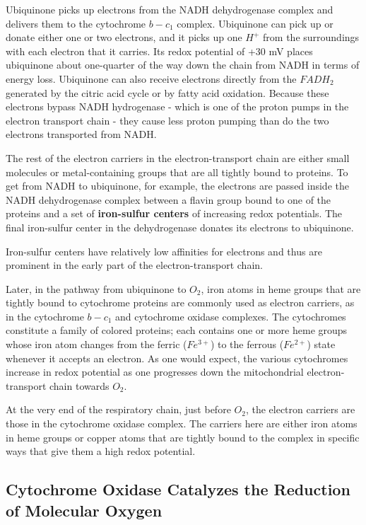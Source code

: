 Ubiquinone picks up electrons from the NADH dehydrogenase complex
and delivers them to the cytochrome $b-c_1$ complex.
Ubiquinone can pick up or donate either one or two electrons, and it
picks up one $H^+$ from the surroundings with each electron that it carries.
Its redox potential of +30 mV places ubiquinone about
one-quarter of the way down the chain from NADH in terms of energy
loss. Ubiquinone can also receive electrons directly from
the $FADH_2$ generated by the citric acid cycle or by fatty acid oxidation.
Because these electrons bypass NADH hydrogenase - which is one of the
proton pumps in the electron transport chain - they cause less proton
pumping than do the two electrons transported from NADH.

The rest of the electron carriers in the electron-transport chain are either
small molecules or metal-containing groups that are all tightly bound to
proteins. To get from NADH to ubiquinone, for example, the electrons are
passed inside the NADH dehydrogenase complex between a flavin group
bound to one of the proteins and a set of \textbf{iron-sulfur centers} of
increasing redox potentials. The final iron-sulfur center in the dehydrogenase
donates its electrons to ubiquinone.

Iron-sulfur centers have relatively low affinities for electrons and thus
are prominent in the early part of the electron-transport chain.

Later, in the pathway from ubiquinone to $O_2$, iron atoms in heme groups that are
tightly bound to cytochrome proteins are commonly used as electron
carriers, as in the cytochrome $b-c_1$ and cytochrome oxidase complexes.
The cytochromes constitute a family of colored proteins; each contains one or more heme
groups whose iron atom changes from the ferric ($Fe^{3+}$) to the ferrous
($Fe^{2+}$) state whenever it accepts an electron. As one would expect, the
various cytochromes increase in redox potential as one progresses down
the mitochondrial electron-transport chain towards $O_2$.

At the very end of the respiratory chain, just before $O_2$, the electron carriers
are those in the cytochrome oxidase complex. The carriers here are
either iron atoms in heme groups or copper atoms that are tightly bound
to the complex in specific ways that give them a high redox potential.

\subsection{Cytochrome Oxidase Catalyzes the Reduction of Molecular Oxygen}

